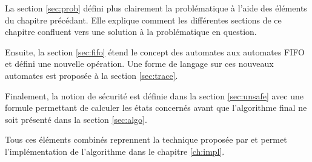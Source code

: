 La section \ref{sec:prob} défini plus clairement la problématique à l'aide des éléments du chapitre précédant. Elle explique comment les différentes sections de ce chapitre confluent vers une solution à la problématique en question.

Ensuite, la section \ref{sec:fifo} étend le concept des automates aux automates FIFO et défini une nouvelle opération. Une forme de langage sur ces nouveaux automates est proposée à la section \ref{sec:trace}.

Finalement, la notion de sécurité est définie dans la section \ref{sec:unsafe} avec une formule permettant de calculer les états concernés avant que l'algorithme final ne soit présenté dans la section \ref{sec:algo}.

Tous ces éléments combinés reprennent la technique proposée par \cite{Vardhan04} et permet l'implémentation de l'algorithme dans le chapitre \ref{ch:impl}.
